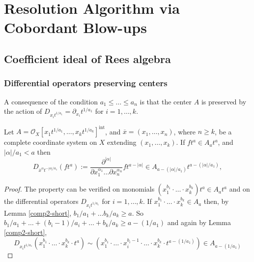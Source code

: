 \documentclass{amsart}
\newcommand{\cA}{{\mathcal A}}
\newcommand{\cJ}{{\mathcal J}}
\newcommand{\cO}{{\mathcal O}}
\newcommand{\ord}{{\operatorname{ord}}}
\newcommand{\inv}{{\operatorname{inv}}}
\newcommand{\inte}{{\operatorname{int}}}
\begin{document}
\section{Resolution Algorithm via Cobordant Blow-ups}

\subsection{Coefficient ideal of Rees algebra}
\subsubsection{Differential operators preserving centers}
A  consequence of the condition $a_1\leq\ldots\leq a_n$ is that the center $A$ is preserved by the action of $D_{x_it^{1/a_1}}=\partial_{x_i} t^{1/a_1}$ for $i=1,\ldots,k$.
\begin{lemma} \label{obvious2} Let $A=\cO_X[{x}_1t^{1/a_1},\ldots,{x_k}t^{1/a_k}]^\inte$, and $\overline{x}=({x}_1,\ldots,{x}_n)$, where $n\geq k$, be a complete coordinate system on $X$ extending $({x}_1,\ldots,{x}_k)$.
If $ft^a\in A_a t^a$, and $|\alpha|/a_1< a$ then
$$D_{\overline{x}^{\alpha} t^{-|\alpha|/a_1}}(ft^a):=\frac{\partial^{|\alpha|}}{\partial x_1^{\alpha_1}\ldots \partial x_n^{\alpha_n}}ft^{a-|\alpha|} \in A_{a-(|\alpha|/a_1)} t^{a-(|\alpha|/a_1)}, $$	

\end{lemma}
 \begin{proof}%
 
 The property can be verified on monomials $(x_1^{b_1}\cdot\ldots\cdot x_k^{b_k})t^a\in A_{a}t^a$ and on the differential operators $D_{x_it^{1/a_1}}$ for $i=1,\ldots,k$.
 If $x_1^{b_1}\cdot\ldots\cdot x_k^{b_k}\in A_{a}$ then, by Lemma \ref{comp2-short}, 
 $b_1/a_1+\ldots b_k/a_k\geq a$. 
 So $b_1/a_1+\ldots +(b_i-1)/a_i+\ldots +b_k/a_k\geq a-(1/a_1)$ and again by Lemma \ref{comp2-short}, 
 $$D_{x_it^{1/a_1}}(x_1^{b_1}\cdot\ldots\cdot x_k^{b_k} \cdot t^a)\sim (x_1^{b_1}\cdot\ldots\cdot x_i^{b_i-1}\cdot \ldots  \cdot x_k^{b_k} \cdot t^{a-(1/a_1)})\in A_{a-(1/a_1)}$$
 	
 \end{proof}
\end{document}
